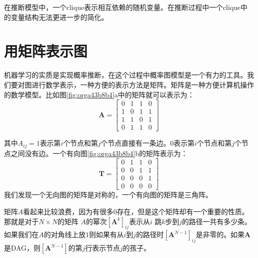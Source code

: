 \documentclass[10pt,a4paper,UTF8]{article}
\begin{document}
在推断模型中，一个clique表示相互依赖的随机变量。在推断过程中一个clique中的变量结构无法更进一步的简化。

\section{用矩阵表示图}
\label{sec:org91b42bd}


机器学习的实质是实现概率推断，在这个过程中概率图模型是一个有力的工具。我们要对图进行数学表示，一种方便的表示方法是矩阵。矩阵是一种方便计算机操作的数学模型。比如图\ref{fig:orga43b8b4}a中的矩阵就可以表示为：
\begin{equation}
\label{eq:12}
\mathbf{A}  =
\begin{bmatrix}
0 & 1 & 1 & 0 \\
1 & 0 & 1 & 1 \\
1 & 1 & 0 & 1 \\
0 & 1 & 1 & 0 
\end{bmatrix}
\end{equation}

其中\(A_{ij} = 1\)表示第\(i\)个节点和第\(j\)个节点直接有一条边。\(0\)表示第\(i\)个节点和第\(j\)个节点之间没有边。一个有向图\ref{fig:orga43b8b4}b的矩阵表示为：
\begin{equation}
\label{eq:1}
\mathbf{T}  =
\begin{bmatrix}
0 & 1 & 1 & 0 \\
0 & 0 & 1 & 1 \\
0 & 0 & 0 & 1 \\
0 & 0 & 0 & 0
\end{bmatrix} 
\end{equation}
我们发现一个无向图的矩阵是对称的，一个有向图的矩阵是三角阵。

矩阵\(A\)看起来比较浪费，因为有很多\(0\)存在，但是这个矩阵却有一个重要的性质。那就是对于\(N\times N\)的矩阵 \(A\)的幂次\([\mathbf{A}^{k}]_{ij}\)表示从\(i\) 跳\(k\)步到\(j\)的路径一共有多少条。如果我们在\(A\)的对角线上放\(1\)则如果有从\(i\)到\(j\)的路径时\([\mathbf{A}^{N-1}]_{ij}\)是非零的。如果\(\mathbf{A}\)是DAG，则\([\mathbf{A}^{N-1}]\)的第\(j\)行表示节点\(j\)的孩子。
\end{document}
